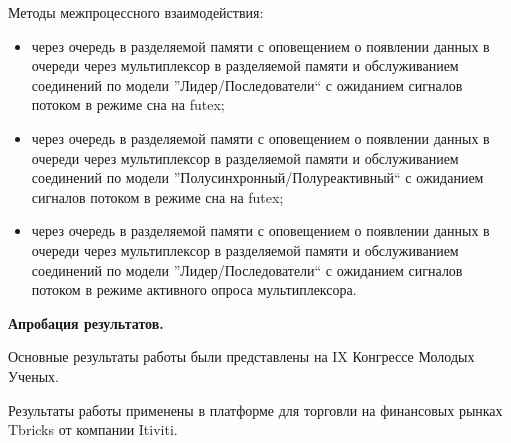 Методы межпроцессного взаимодействия:
\begin{itemize}
\item через очередь в разделяемой памяти с оповещением о появлении данных в очереди через мультиплексор в разделяемой памяти и обслуживанием соединений по модели ''Лидер/Последователи`` с ожиданием сигналов потоком в режиме сна на futex;
\item через очередь в разделяемой памяти с оповещением о появлении данных в очереди через мультиплексор в разделяемой памяти и обслуживанием соединений по модели ''Полусинхронный/Полуреактивный`` с ожиданием сигналов потоком в режиме сна на futex;
\item через очередь в разделяемой памяти с оповещением о появлении данных в очереди через мультиплексор в разделяемой памяти и обслуживанием соединений по модели ''Лидер/Последователи`` с ожиданием сигналов потоком в режиме активного опроса мультиплексора.
\end{itemize}


\textbf{Апробация результатов.}

Основные результаты работы были представлены на IX Конгрессе Молодых Ученых.

Результаты работы применены в платформе для торговли на финансовых рынках Tbricks от компании Itiviti.
